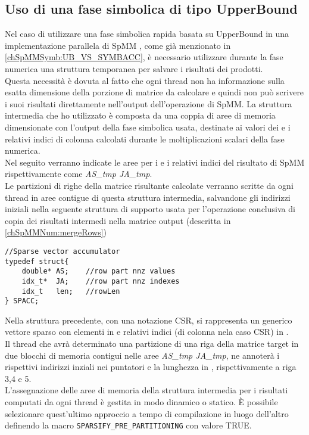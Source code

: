 \subsection{Uso di una fase simbolica di tipo UpperBound}
Nel caso di utilizzare una fase simbolica rapida basata su UpperBound in una implementazione parallela di SpMM
, come già menzionato in \ref{chSpMMSymb:UB_VS_SYMBACC},
è necessario utilizzare durante la fase numerica una struttura temporanea per salvare i risultati dei prodotti.\\
\label{chSpMMNum:UB_necessitaCopyBack}
Questa necessità è dovuta al fatto che ogni thread non ha informazione sulla esatta dimensione della porzione di
matrice da calcolare e quindi non può scrivere i suoi risultati direttamente nell'output dell'operazione di SpMM.
\voidLine
La struttura intermedia che ho utilizzato è composta da una coppia di aree di memoria
dimensionate con l'output della fase simbolica usata, destinate ai
valori dei \nnz e i relativi indici di colonna calcolati durante le moltiplicazioni scalari della fase numerica.\\
Nel seguito verranno indicate le aree per i \nnz e i relativi indici del risultato di SpMM rispettivamente come 
\emph{AS\_tmp JA\_tmp}.\\
\label{chSpMMNum:SPACC}	%
Le partizioni di righe della matrice risultante calcolate verranno scritte da ogni thread
in aree contigue di questa struttura intermedia, salvandone gli indirizzi iniziali 
nella seguente struttura di supporto
usata per l'operazione conclusiva di copia dei risultati intermedi nella matrice output
(descritta in \ref{chSpMMNum:mergeRows})
\begin{lstlisting}
//Sparse vector accumulator
typedef struct{                                               
    double* AS;    //row part nnz values                                         
    idx_t*  JA;    //row part nnz indexes
    idx_t   len;   //rowLen
} SPACC;           
\end{lstlisting}
Nella struttura precedente, con una notazione CSR, si rappresenta un generico vettore sparso 
con  elementi \nnz in  e relativi indici (di colonna nela caso CSR) in .\\
Il thread che avrà determinato una partizione di una riga della matrice target
in due blocchi di memoria contigui nelle aree \emph{AS\_tmp JA\_tmp},
ne annoterà i rispettivi indirizzi inziali nei puntatori  e la lunghezza in ,
rispettivamente a riga 3,4 e 5.\\
L'assegnazione delle aree di memoria della struttura intermedia per i risultati computati 
da ogni thread è gestita in modo dinamico o statico.
È possibile selezionare quest'ultimo approccio a tempo di compilazione in luogo dell'altro
definendo la macro \verb|SPARSIFY_PRE_PARTITIONING| con valore {TRUE}.\\

